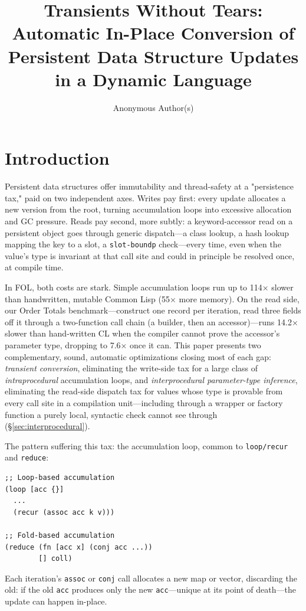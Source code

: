 \documentclass[sigplan,review,anonymous]{acmart}
\title[Transients Without Tears]{Transients Without Tears: Automatic In-Place Conversion of Persistent Data Structure Updates in a Dynamic Language}
\author{Anonymous Author(s)}
\affiliation{%
  \institution{Anonymous Institution}
  \city{Anonymous City}
  \country{Anonymous Country}
}
\begin{document}
\maketitle

\section{Introduction}

Persistent data structures offer immutability and thread-safety at a "persistence tax," paid on two independent axes. Writes pay first: every update allocates a new version from the root, turning accumulation loops into excessive allocation and GC pressure. Reads pay second, more subtly: a keyword-accessor read on a persistent object goes through generic dispatch---a class lookup, a hash lookup mapping the key to a slot, a \texttt{slot-boundp} check---every time, even when the value's type is invariant at that call site and could in principle be resolved once, at compile time.

In FOL, both costs are stark. Simple accumulation loops run up to 114× slower than handwritten, mutable Common Lisp (55× more memory). On the read side, our Order Totals benchmark---construct one record per iteration, read three fields off it through a two-function call chain (a builder, then an accessor)---runs 14.2× slower than hand-written CL when the compiler cannot prove the accessor's parameter type, dropping to 7.6× once it can. This paper presents two complementary, sound, automatic optimizations closing most of each gap: \emph{transient conversion}, eliminating the write-side tax for a large class of \emph{intraprocedural} accumulation loops, and \emph{interprocedural parameter-type inference}, eliminating the read-side dispatch tax for values whose type is provable from every call site in a compilation unit---including through a wrapper or factory function a purely local, syntactic check cannot see through (§\ref{sec:interprocedural}).

The pattern suffering this tax: the accumulation loop, common to \texttt{loop/recur} and \texttt{reduce}:

\begin{lstlisting}
;; Loop-based accumulation
(loop [acc {}]
  ...
  (recur (assoc acc k v)))

;; Fold-based accumulation
(reduce (fn [acc x] (conj acc ...))
        [] coll)
\end{lstlisting}

Each iteration's \texttt{assoc} or \texttt{conj} call allocates a new map or vector, discarding the old: if the old \texttt{acc} produces only the new \texttt{acc}---unique at its point of death---the update can happen in-place.
\end{document}
